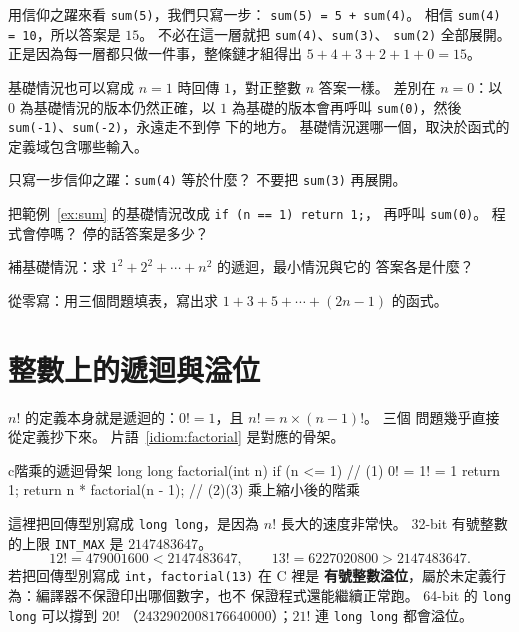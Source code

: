 
用信仰之躍來看 \texttt{sum(5)}，我們只寫一步：
\texttt{sum(5) = 5 + sum(4)}。 相信 \texttt{sum(4) = 10}，所以答案是
$15$。 不必在這一層就把 \texttt{sum(4)}、\texttt{sum(3)}、
\texttt{sum(2)} 全部展開。 正是因為每一層都只做一件事，整條鏈才組得出
$5+4+3+2+1+0 = 15$。

基礎情況也可以寫成 $n = 1$ 時回傳 $1$，對正整數 $n$ 答案一樣。 差別在
$n = 0$：以 $0$ 為基礎情況的版本仍然正確，以 $1$ 為基礎的版本會再呼叫
\texttt{sum(0)}，然後 \texttt{sum(-1)}、\texttt{sum(-2)}，永遠走不到停
下的地方。 基礎情況選哪一個，取決於函式的定義域包含哪些輸入。


\begin{drills}[label=drills:rec-three-q]
\item 只寫一步信仰之躍：\texttt{sum(4)} 等於什麼？ 不要把 \texttt{sum(3)}
再展開。
\item 把範例~\ref{ex:sum} 的基礎情況改成 \texttt{if (n == 1) return 1;}，
再呼叫 \texttt{sum(0)}。 程式會停嗎？ 停的話答案是多少？
\item 補基礎情況：求 $1^2 + 2^2 + \cdots + n^2$ 的遞迴，最小情況與它的
答案各是什麼？
\item 從零寫：用三個問題填表，寫出求 $1+3+5+\cdots+(2n-1)$ 的函式。
\end{drills}

\section{整數上的遞迴與溢位}
\label{sec:rec-int}

$n!$ 的定義本身就是遞迴的：$0! = 1$，且 $n! = n \times (n-1)!$。 三個
問題幾乎直接從定義抄下來。 片語~\ref{idiom:factorial} 是對應的骨架。

\begin{code}[label=idiom:factorial]{c}{階乘的遞迴骨架}
long long factorial(int n) {
    if (n <= 1) {                 // (1) 0! = 1! = 1
        return 1;
    }
    return n * factorial(n - 1);  // (2)(3) 乘上縮小後的階乘
}
\end{code}

這裡把回傳型別寫成 \texttt{long long}，是因為 $n!$ 長大的速度非常快。
32-bit 有號整數的上限 \texttt{INT\_MAX} 是 $2147483647$。
\[
12! = 479001600 < 2147483647, \qquad
13! = 6227020800 > 2147483647.
\]
若把回傳型別寫成 \texttt{int}，\texttt{factorial(13)} 在 C 裡是
\textbf{有號整數溢位}，屬於未定義行為：編譯器不保證印出哪個數字，也不
保證程式還能繼續正常跑。 64-bit 的 \texttt{long long} 可以撐到 $20!$
（$2432902008176640000$）；$21!$ 連 \texttt{long long} 都會溢位。

